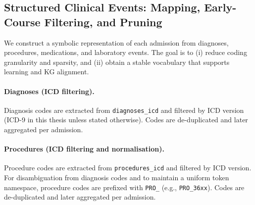 


\subsection{Structured Clinical Events: Mapping, Early-Course Filtering, and Pruning}
\label{subsec:struct-preproc}

We construct a symbolic representation of each admission from diagnoses, procedures, medications, and laboratory events. The goal is to (i) reduce coding granularity and sparsity, and (ii) obtain a stable vocabulary that supports learning and KG alignment.

\paragraph{Diagnoses (ICD filtering).}
Diagnosis codes are extracted from \texttt{diagnoses\_icd} and filtered by ICD version (ICD-9 in this thesis unless stated otherwise). Codes are de-duplicated and later aggregated per admission.

\paragraph{Procedures (ICD filtering and normalisation).}
Procedure codes are extracted from \texttt{procedures\_icd} and filtered by ICD version. For disambiguation from diagnosis codes and to maintain a uniform token namespace, procedure codes are prefixed with \texttt{PRO\_} (e.g., \texttt{PRO\_36xx}). Codes are de-duplicated and later aggregated per admission.

